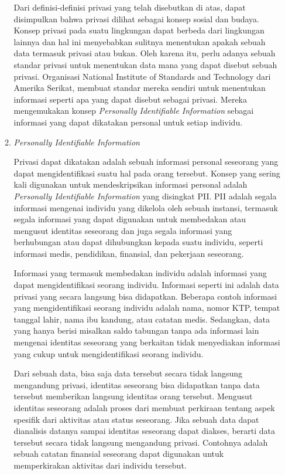 \documentclass[a4paper,twoside]{article}
\begin{document}
\begin{enumerate}
\begin{enumerate}
			Dari definisi-definisi privasi yang telah disebutkan di atas, dapat disimpulkan bahwa privasi dilihat sebagai konsep sosial dan budaya. Konsep privasi pada suatu lingkungan dapat berbeda dari lingkungan lainnya dan hal ini menyebabkan sulitnya menentukan apakah sebuah data termasuk privasi atau bukan. Oleh karena itu, perlu adanya sebuah standar privasi untuk menentukan data mana yang dapat disebut sebuah privasi. Organisasi National Institute of Standards and Technology dari Amerika Serikat, membuat standar mereka sendiri untuk menentukan informasi seperti apa yang dapat disebut sebagai privasi. Mereka mengemukakan konsep \textit{Personally Identifiable Information} sebagai informasi yang dapat dikatakan personal untuk setiap individu.

			\item \textit{Personally Identifiable Information}
			
			Privasi dapat dikatakan adalah sebuah informasi personal seseorang yang dapat mengidentifikasi suatu hal pada orang tersebut. Konsep yang sering kali digunakan untuk mendeskripsikan informasi personal adalah \textit{Personally Identifiable Information} yang disingkat PII. PII adalah segala informasi mengenai individu yang dikelola oleh sebuah instansi, termasuk segala informasi yang dapat digunakan untuk membedakan atau mengusut identitas seseorang dan juga segala informasi yang berhubungan atau dapat dihubungkan kepada suatu individu, seperti informasi medis, pendidikan, finansial, dan pekerjaan seseorang. 

			Informasi yang termasuk membedakan individu adalah informasi yang dapat mengidentifikasi seorang individu. Informasi seperti ini adalah data privasi yang secara langsung bisa didapatkan. Beberapa contoh informasi yang mengidentifikasi seorang individu adalah nama, nomor KTP, tempat tanggal lahir, nama ibu kandung, atau catatan medis. Sedangkan, data yang hanya berisi misalkan saldo tabungan tanpa ada informasi lain mengenai identitas seseorang yang berkaitan tidak menyediakan informasi yang cukup untuk mengidentifikasi seorang individu.

			Dari sebuah data, bisa saja data tersebut secara tidak langsung mengandung privasi, identitas seseorang bisa didapatkan tanpa data tersebut memberikan langsung identitas orang tersebut. Mengusut identitas seseorang adalah proses dari membuat perkiraan tentang aspek spesifik dari aktivitas atau status seseorang. Jika sebuah data dapat dianalisis datanya sampai identitas seseorang dapat diakses, berarti data tersebut secara tidak langsung mengandung privasi. Contohnya adalah sebuah catatan finansial seseorang dapat digunakan untuk memperkirakan aktivitas dari individu tersebut.


\end{enumerate}
\end{enumerate}
\end{document}
